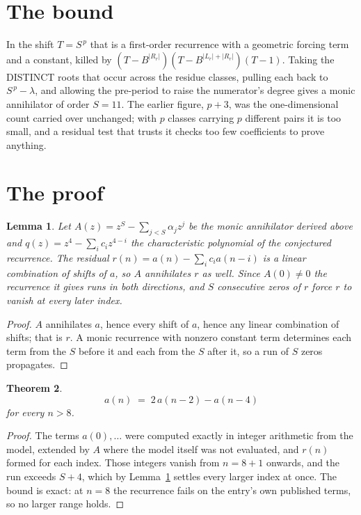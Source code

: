 \documentclass[11pt,a4paper]{article}
\theoremstyle{plain}
\newtheorem{theorem}{Theorem}
\newtheorem{lemma}[theorem]{Lemma}
\theoremstyle{definition}
\begin{document}
\section{The bound}

In the shift $T=S^{\,p}$ that is a first-order recurrence with a geometric forcing term and a
constant, killed by $(T-B^{|R_r|})(T-B^{|L_r|+|R_r|})(T-1)$. Taking the DISTINCT roots that
occur across the residue classes, pulling each back to $S^{\,p}-\lambda$, and allowing the
pre-period to raise the numerator's degree gives a monic annihilator of order $S=11$. The
earlier figure, $p+3$, was the one-dimensional count carried over unchanged; with $p$ classes
carrying $p$ different pairs it is too small, and a residual test that trusts it checks too few
coefficients to prove anything.

\section{The proof}

\begin{lemma}\label{lem:crit}
Let $A(z)=z^S-\sum_{j<S}\alpha_jz^{j}$ be the monic annihilator derived above and
$q(z)=z^{4}-\sum_ic_iz^{4-i}$ the characteristic polynomial of the conjectured
recurrence. The residual $r(n)=a(n)-\sum_ic_ia(n-i)$ is a linear combination of shifts of $a$,
so $A$ annihilates $r$ as well. Since $A(0)\ne0$ the recurrence it gives runs in both
directions, and $S$ consecutive zeros of $r$ force $r$ to vanish at every later index.
\end{lemma}

\begin{proof}
$A$ annihilates $a$, hence every shift of $a$, hence any linear combination of shifts; that is
$r$. A monic recurrence with nonzero constant term determines each term from the $S$ before it
and each from the $S$ after it, so a run of $S$ zeros propagates.
\end{proof}

\begin{theorem}
\[
a(n)\;=\;2\,a(n-2) - a(n-4)
\]
for every $n>8$.
\end{theorem}

\begin{proof}
The terms $a(0),\dots$ were computed exactly in integer arithmetic from the model, extended by
$A$ where the model itself was not evaluated, and $r(n)$ formed for each index. Those integers
vanish from $n=8+1$ onwards, and the run exceeds $S+4$, which by
Lemma~\ref{lem:crit} settles every larger index at once. The bound is exact: at $n=8$ the recurrence fails on the entry's own published terms, so no larger range holds.
\end{proof}
\end{document}
